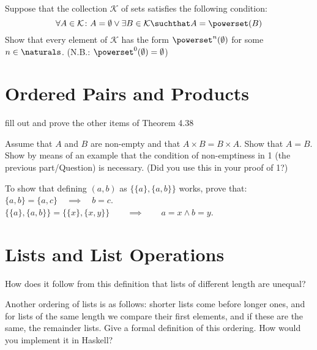 \documentclass{report}
\begin{document}
\begin{Exercise} [number=35, difficulty=1]
  Suppose that the collection $\mathcal{K}$ of sets satisfies the
  following condition:
  \begin{displaymath}
    \forall{A} \in \mathcal{K} \colon A = \emptyset \lor \exists{B \in
    \mathcal{K}} \suchthat A = \powerset(B)
  \end{displaymath}
  \ExeText Show that every element of $\mathcal{K}$ has the form
  $\powerset^n(\emptyset)$ for some $n \in \naturals$. (N.B.:
  $\powerset^0(\emptyset) = \emptyset$)
\end{Exercise}

\section{Ordered Pairs and Products}

\begin{Exercise} [number=39]
fill out and prove the other items of Theorem 4.38
\end{Exercise}

\begin{Exercise} [number=40]
  \Question Assume that $A$ and $B$ are non-empty and that $A \times B = B \times A$. Show that $A = B$.
  \Question Show by means of an example that the condition of non-emptiness in 1 (the previous part/Question) is necessary. (Did you use this in your proof of 1?)
\end{Exercise}

\begin{Exercise} [number=41, difficulty=1]
  To show that defining $(a,b)$ as $\bigl\{ \{a\}, \{a,b\} \bigr\}$ works, prove that:
  \Question $\{a, b\} = \{a, c\} \quad \implies \quad b = c$.
  \Question $\bigl\{ \{a\}, \{a, b\}\bigr\} = \bigl\{ \{x\}, \{x, y\} \bigr\} \qquad \implies \qquad a = x \land b = y$.
\end{Exercise}
\section{Lists and List Operations}

\begin{Exercise} [number=43]
  How does it follow from this definition that lists of different length are unequal?
\end{Exercise}

\begin{Exercise} [number=44]
  Another ordering of lists is as follows: shorter lists come before
  longer ones, and for lists of the same length we compare their first
  elements, and if these are the same, the remainder lists. Give a
  formal definition of this ordering. How would you implement it in Haskell?
\end{Exercise}
\end{document}
